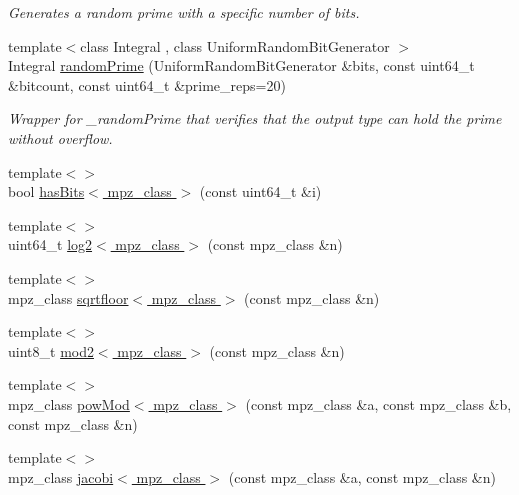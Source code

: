 \begin{DoxyCompactItemize}
\begin{DoxyCompactList}\small\item\em Generates a random prime with a specific number of bits. \end{DoxyCompactList}\item 
{\footnotesize template$<$class Integral , class Uniform\+Random\+Bit\+Generator $>$ }\\Integral \hyperlink{namespacecryptomath_a93f24268856fbd366cb688640736fb60}{random\+Prime} (Uniform\+Random\+Bit\+Generator \&bits, const uint64\+\_\+t \&bitcount, const uint64\+\_\+t \&prime\+\_\+reps=20)
\begin{DoxyCompactList}\small\item\em Wrapper for \+\_\+random\+Prime that verifies that the output type can hold the prime without overflow. \end{DoxyCompactList}\item 
{\footnotesize template$<$$>$ }\\bool \hyperlink{namespacecryptomath_aea4ea3d67f0fc08b698da0b718244b4f}{has\+Bits$<$ mpz\+\_\+class $>$} (const uint64\+\_\+t \&i)
\item 
{\footnotesize template$<$$>$ }\\uint64\+\_\+t \hyperlink{namespacecryptomath_ace84983f1bbb2211b1fba2c6a606c678}{log2$<$ mpz\+\_\+class $>$} (const mpz\+\_\+class \&n)
\item 
{\footnotesize template$<$$>$ }\\mpz\+\_\+class \hyperlink{namespacecryptomath_abfcd8397f758faec532f382662223fb6}{sqrtfloor$<$ mpz\+\_\+class $>$} (const mpz\+\_\+class \&n)
\item 
{\footnotesize template$<$$>$ }\\uint8\+\_\+t \hyperlink{namespacecryptomath_a44ebe48f61ac75ba4a1cda2ef1fd168c}{mod2$<$ mpz\+\_\+class $>$} (const mpz\+\_\+class \&n)
\item 
{\footnotesize template$<$$>$ }\\mpz\+\_\+class \hyperlink{namespacecryptomath_a482b681cd134f41c52e4801ee0f61de2}{pow\+Mod$<$ mpz\+\_\+class $>$} (const mpz\+\_\+class \&a, const mpz\+\_\+class \&b, const mpz\+\_\+class \&n)
\item 
{\footnotesize template$<$$>$ }\\mpz\+\_\+class \hyperlink{namespacecryptomath_a47b55922895218d613733ea0370e8e5f}{jacobi$<$ mpz\+\_\+class $>$} (const mpz\+\_\+class \&a, const mpz\+\_\+class \&n)
\end{DoxyCompactItemize}


